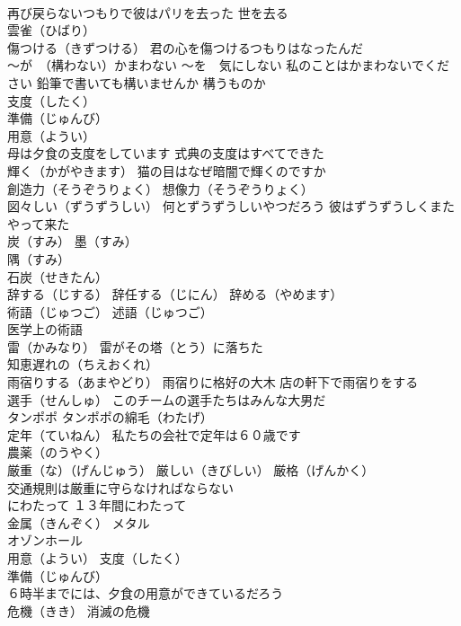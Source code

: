 \documentclass[8pt]{extreport}
\begin{document}
\begin{CJK}{UTF8}{min}
\\	再び戻らないつもりで彼はパリを去った 世を去る
\\	雲雀（ひばり）
\\	傷つける（きずつける） 君の心を傷つけるつもりはなったんだ
\\	～が　（構わない）かまわない ～を　気にしない 私のことはかまわないでください 鉛筆で書いても構いませんか 構うものか
\\	支度（したく）
\\	準備（じゅんび）
\\	用意（ようい）
\\	母は夕食の支度をしています 式典の支度はすべてできた
\\	輝く（かがやきます） 猫の目はなぜ暗闇で輝くのですか
\\	創造力（そうぞうりょく） 想像力（そうぞうりょく）
\\	図々しい（ずうずうしい） 何とずうずうしいやつだろう 彼はずうずうしくまたやって来た
\\	炭（すみ） 墨（すみ）
\\	隅（すみ）
\\	石炭（せきたん）
\\	辞する（じする） 辞任する（じにん） 辞める（やめます）
\\	術語（じゅつご） 述語（じゅつご）
\\	医学上の術語
\\	雷（かみなり） 雷がその塔（とう）に落ちた
\\	知恵遅れの（ちえおくれ）
\\	雨宿りする（あまやどり） 雨宿りに格好の大木 店の軒下で雨宿りをする
\\	選手（せんしゅ） このチームの選手たちはみんな大男だ
\\	タンポポ タンポポの綿毛（わたげ）
\\	定年（ていねん） 私たちの会社で定年は６０歳です
\\	農薬（のうやく）
\\	厳重（な）（げんじゅう） 厳しい（きびしい） 厳格（げんかく） 
\\	交通規則は厳重に守らなければならない
\\	にわたって １３年間にわたって
\\	金属（きんぞく） メタル
\\	オゾンホール
\\	用意（ようい） 支度（したく）
\\	準備（じゅんび）
\\	６時半までには、夕食の用意ができているだろう
\\	危機（きき） 消滅の危機

\end{CJK}
\end{document}
